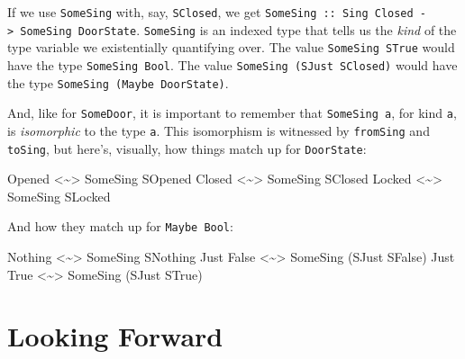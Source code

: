 \documentclass[]{article}
\newenvironment{Shaded}{}{}
\newcommand{\DataTypeTok}[1]{\textcolor[rgb]{0.56,0.13,0.00}{#1}}
\newcommand{\NormalTok}[1]{#1}
\newcommand{\OperatorTok}[1]{\textcolor[rgb]{0.40,0.40,0.40}{#1}}
\begin{document}
If we use \texttt{SomeSing} with, say, \texttt{SClosed}, we get
\texttt{SomeSing\ ::\ Sing\ \textquotesingle{}Closed\ -\textgreater{}\ SomeSing\ DoorState}.
\texttt{SomeSing} is an indexed type that tells us the \emph{kind} of the type
variable we existentially quantifying over. The value \texttt{SomeSing\ STrue}
would have the type \texttt{SomeSing\ Bool}. The value
\texttt{SomeSing\ (SJust\ SClosed)} would have the type
\texttt{SomeSing\ (Maybe\ DoorState)}.

And, like for \texttt{SomeDoor}, it is important to remember that
\texttt{SomeSing\ a}, for kind \texttt{a}, is \emph{isomorphic} to the type
\texttt{a}. This isomorphism is witnessed by \texttt{fromSing} and
\texttt{toSing}, but here's, visually, how things match up for
\texttt{DoorState}:

\begin{Shaded}
\begin{Highlighting}[]
\DataTypeTok{Opened}   \OperatorTok{\textless{}\textasciitilde{}\textgreater{}}    \DataTypeTok{SomeSing} \DataTypeTok{SOpened}
\DataTypeTok{Closed}   \OperatorTok{\textless{}\textasciitilde{}\textgreater{}}    \DataTypeTok{SomeSing} \DataTypeTok{SClosed}
\DataTypeTok{Locked}   \OperatorTok{\textless{}\textasciitilde{}\textgreater{}}    \DataTypeTok{SomeSing} \DataTypeTok{SLocked}
\end{Highlighting}
\end{Shaded}

And how they match up for \texttt{Maybe\ Bool}:

\begin{Shaded}
\begin{Highlighting}[]
\DataTypeTok{Nothing}      \OperatorTok{\textless{}\textasciitilde{}\textgreater{}}  \DataTypeTok{SomeSing} \DataTypeTok{SNothing}
\DataTypeTok{Just} \DataTypeTok{False}   \OperatorTok{\textless{}\textasciitilde{}\textgreater{}}  \DataTypeTok{SomeSing}\NormalTok{ (}\DataTypeTok{SJust} \DataTypeTok{SFalse}\NormalTok{)}
\DataTypeTok{Just} \DataTypeTok{True}    \OperatorTok{\textless{}\textasciitilde{}\textgreater{}}  \DataTypeTok{SomeSing}\NormalTok{ (}\DataTypeTok{SJust} \DataTypeTok{STrue}\NormalTok{)}
\end{Highlighting}
\end{Shaded}

\section{Looking Forward}\label{looking-forward}
\end{document}
